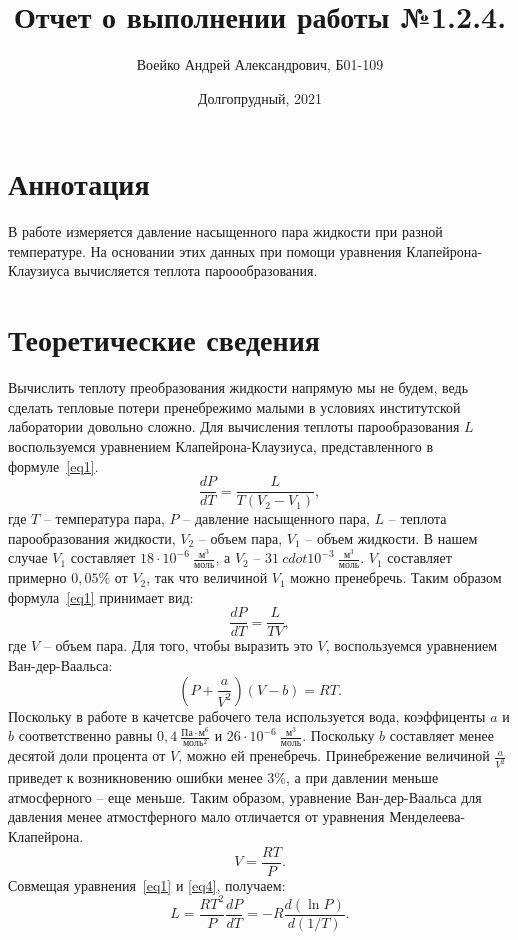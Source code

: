 \documentclass[a4paper,11pt]{article}
\title{Отчет о выполнении работы №1.2.4.}
\author{Воейко Андрей Александрович, Б01-109}
\date{Долгопрудный, 2021}
\begin{document}
\maketitle
\newpage
\section{Аннотация}
В работе измеряется давление насыщенного пара жидкости при разной температуре. На основании этих данных при помощи уравнения Клапейрона-Клаузиуса вычисляется теплота пароообразования.
\section{Теоретические сведения}
Вычислить теплоту преобразования жидкости напрямую мы не будем, ведь сделать тепловые потери пренебрежимо малыми в условиях институтской лаборатории довольно сложно. Для вычисления теплоты парообразования $L$ воспользуемся уравнением Клапейрона-Клаузиуса, представленного в формуле~\ref{eq1}.
\begin{equation}    \label{eq1}
  \frac{dP}{dT}=\frac{L}{T(V_{2}-V_{1})},
\end{equation}
где $T$ -- температура пара, $P$ -- давление насыщенного пара, $L$ -- теплота парообразования жидкости, $V_{2}$ -- объем пара, $V_{1}$ -- объем жидкости. В нашем случае $V_{1}$ составляет $18 \cdot 10^{-6}\ \frac{м^{3}}{моль}$, а $V_{2}$ -- $31 \ cdot 10^{-3}\ \frac{м^{3}}{моль}$. $V_{1}$ составляет примерно $0,05\%$ от $V_{2}$, так что величиной $V_{1}$ можно пренебречь. Таким образом формула~\ref{eq1} принимает вид:
\begin{equation}    \label{eq2}
  \frac{dP}{dT}=\frac{L}{TV},
\end{equation}
где $V$ -- объем пара. Для того, чтобы выразить это $V$, воспользуемся уравнением Ван-дер-Ваальса:
\begin{equation}    \label{eq3}
  (P + \frac{a}{V^{2}})(V-b)=RT.
\end{equation}
Поскольку в работе в качетсве рабочего тела используется вода, коэффиценты $a$ и $b$ соответственно равны $0,4\ \frac{Па \cdot м^{6}}{моль^{2}}$ и $26 \cdot 10^{-6}\ \frac{м^{3}}{моль}$. Поскольку $b$ составляет менее десятой доли процента от $V$, можно ей пренебречь. Принебрежение величиной $\frac{a}{V^{2}}$ приведет к возникновению ошибки менее $3\%$, а при давлении меньше атмосферного -- еще меньше. Таким образом, уравнение Ван-дер-Ваальса для давления менее атмостферного мало отличается от уравнения Менделеева-Клапейрона.
\begin{equation}    \label{eq4}
  V = \frac{RT}{P}.
\end{equation}
Совмещая уравнения~\ref{eq1} и \ref{eq4}, получаем:
\begin{equation}    \label{eq5}
  L = \frac{RT^{2}}{P} \frac{dP}{dT} = -R \frac{d(\ln P)}{d(1 / T)}.
\end{equation}
\end{document}
